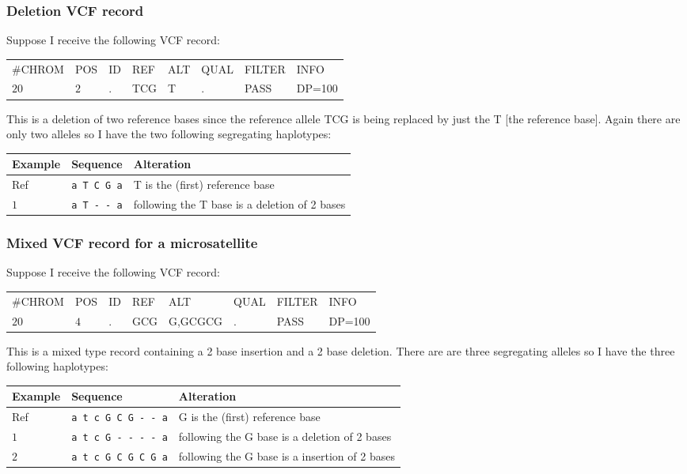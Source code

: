 \documentclass[8pt]{article}
\begin{document}
\subsubsection{Deletion VCF record}
Suppose I receive the following VCF record:

\vspace{0.3cm}
\begin{tabular}{ l l l l l l l l}
	\#CHROM & POS & ID & REF & ALT & QUAL & FILTER & INFO \\
	$20$ & $2$ & . & TCG & T & . & PASS & DP=100 \\
\end{tabular}
\vspace{0.3cm}

This is a deletion of two reference bases since the reference allele TCG is being replaced by just the T [the reference base]. Again there are only two alleles so I have the two following segregating haplotypes:

\vspace{0.3cm}
\begin{tabular}{ | l | l | l | }
\hline
Example & Sequence & Alteration \\ \hline
Ref & \verb|a T C G a| & T is the (first) reference base \\ \hline
$1$ & \verb|a T - - a| & following the T base is a deletion of 2 bases \\ \hline
\end{tabular}

\subsubsection{Mixed VCF record for a microsatellite}
Suppose I receive the following VCF record:

\vspace{0.3cm}
\begin{tabular}{ l l l l l l l l}
	\#CHROM & POS & ID & REF & ALT & QUAL & FILTER & INFO \\
	$20$ & $4$ & . & GCG & G,GCGCG & . & PASS & DP=100 \\
\end{tabular}
\vspace{0.3cm}

This is a mixed type record containing a 2 base insertion and a 2 base deletion. There are are three segregating alleles so I have the three following haplotypes:

\vspace{0.3cm}
\begin{tabular}{ | l | l | l | }
\hline
Example & Sequence & Alteration \\ \hline
Ref & \verb|a t c G C G - - a| & G is the (first) reference base \\ \hline
$1$ & \verb|a t c G - - - - a| & following the G base is a deletion of 2 bases \\ \hline
$2$ & \verb|a t c G C G C G a| & following the G base is a insertion of 2 bases \\ \hline
\end{tabular}
\vspace{0.3cm}
\end{document}
